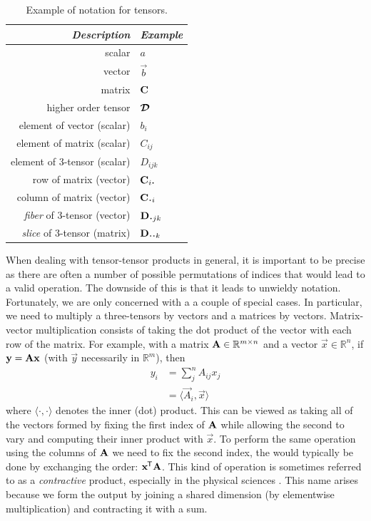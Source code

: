 \begin{table}
\centering
\begin{tabu} to 0.5\linewidth {|r|l|}
\hline 
\textit{Description} & \textit{Example} \\
\hline
scalar & \(a\) \\
vector & \(\vec{b}\) \\
matrix & \(\mathbf{C}\) \\
higher order tensor & \(\bm{\mathcal{D}}\) \\
element of vector (scalar) & \(b_i\) \\
element of matrix (scalar) & \(C_{ij}\) \\
element of 3-tensor (scalar) & \(D_{ijk}\) \\
row of matrix (vector) & \(\vec{C}_{i\midbullet}\) \\
column of matrix (vector) & \(\vec{C}_{\midbullet i}\)\\
\textit{fiber} of 3-tensor (vector) & \(\vec{D}_{\midbullet jk}\)\\
\textit{slice} of 3-tensor (matrix) & \(\mat{D}_{\midbullet\midbullet k}\)\\
\hline
\end{tabu}
\caption{Example of notation for tensors.}
\label{tab:notation}
\end{table}

When dealing with tensor-tensor products in general, it is important to be precise as there are often
a number of possible permutations of indices that would lead to a valid operation. The downside of
this is that it leads to unwieldy notation. Fortunately, we are only concerned with a a couple of
special cases. In particular, we need to multiply a three-tensors by vectors and a matrices by
vectors. Matrix-vector multiplication consists of taking the dot product of the vector with
each row of the matrix. For example, with a matrix \(\mathbf{A} \in \mathbb{R}^{m \times n}\) and a
vector \(\vec{x} \in \mathbb{R}^n\), if \(\mathbf{y} = \mathbf{A}\mathbf{x}\) (with \(\vec{y}\) necessarily
in \(\mathbb{R}^m\)), then
\begin{align}\label{eq:matmul}
	y_i &= \sum_j^n A_{ij} x_j \\
		&= \langle \vec{A}_i, \vec{x}\rangle
\end{align} where \(\langle \cdot, \cdot \rangle\) denotes the inner (dot) product. This can be viewed
as taking all of the vectors formed by fixing the first index of \(\mathbf{A}\) while allowing the second
to vary and computing their inner product with \(\vec{x}\). To perform the same operation using the
columns of \(\mathbf{A}\) we need to fix the second index, the would typically be done by exchanging the
order: \(\mathbf{x}^{\mkern-1.5mu\mathsf{T}}\mathbf{A}\). This kind of operation is sometimes referred to as a
\emph{contractive} product, especially in the physical sciences \autocite{Orus2014}. This name
arises because we form the output by joining a shared dimension (by elementwise multiplication) and
contracting it with a sum.


